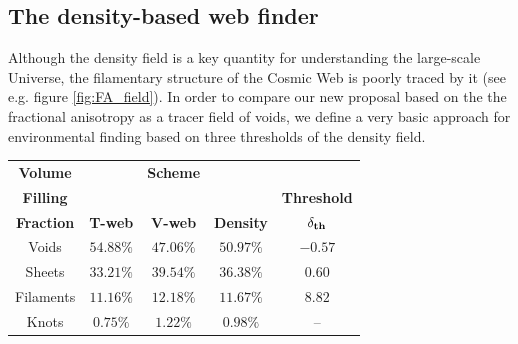 \documentclass[a4,useAMS,usenatbib,usegraphicx]{latex/mn2e}
\begin{document}
\subsection{The density-based web finder}
\label{subsec:Vweb}


Although the density field is a key quantity for understanding the 
large-scale Universe, the filamentary structure of the Cosmic Web is 
poorly traced by it (see e.g. figure \ref{fig:FA_field}). In order to 
compare our new proposal based on the the fractional anisotropy as a 
tracer field of voids, we define a very basic approach for environmental 
finding based on three thresholds of the density field. 


\begin{table}[h]
\begin{flushleft}
\begin{center}
  \begin{tabular}{c  c  c  c c} \hline\hline
	\textbf{Volume}  &				&\textbf{Scheme}& \\
	\textbf{Filling} &				&				&					  &  \textbf{Threshold} \\ 
	\textbf{Fraction}&\textbf{T-web}&\textbf{V-web}	&	\textbf{Density}  &  $\bf{\delta_{th}}$  \\ \hline
	Voids			 &	$54.88\%$	&	$47.06\%$	&	$50.97\%$	 	  &	$ -0.57$			\\ 
	Sheets		     &	$33.21\%$	&	$39.54\%$	&	$36.38\%$ 	      &	$0.60$				\\
	Filaments		 &	$11.16\%$	&	$12.18\%$	&	$11.67\%$ 		  &	$8.82$				\\
	Knots			 &	$0.75\%$	&	$1.22\%$	&	$0.98\%$  		  &	--		\\ \hline\hline
  \end{tabular}  
  
  \label{tab:VFF}
\end{center}
\end{flushleft}
\end{table}
\end{document}
